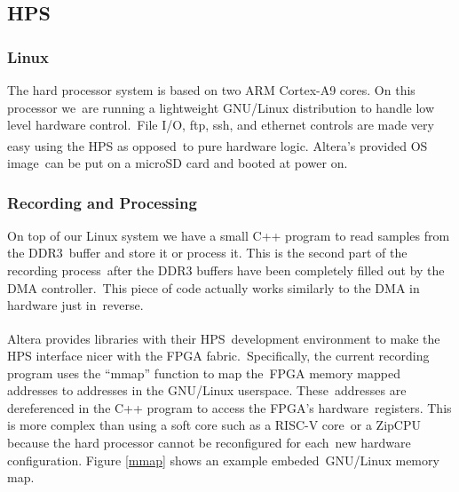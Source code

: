 \documentclass{article}
\begin{document}

\subsection{HPS}

\subsubsection{Linux}
The hard processor system is based on two ARM Cortex-A9 cores.  On this processor we\ are running a lightweight GNU/Linux distribution to handle low level hardware control.\
File I/O, ftp, ssh, and ethernet controls are made very easy using the HPS as opposed\
to pure hardware logic. Altera\textsuperscript{\textregistered{}}'s provided OS image\
can be put on a microSD card and booted at power on.

\subsubsection{Recording and Processing}
On top of our Linux system we have a small C++ program to read samples from the DDR3\
buffer and store it or process it.  This is the second part of the recording process\
after the DDR3 buffers have been completely filled out by the DMA controller.\
This piece of code actually works similarly to the DMA in hardware just in\
reverse. 

Altera\textsuperscript{\textregistered{}} provides libraries with their HPS\
development environment to make the HPS interface nicer with the FPGA fabric.\
Specifically, the current recording program uses the ``mmap'' function to map the\
FPGA memory mapped addresses to addresses in the GNU/Linux userspace. These\
addresses are dereferenced in the C++ program to access the FPGA's hardware\
registers. This is more complex than using a soft core such as a RISC-V core\
or a ZipCPU because the hard processor cannot be reconfigured for each\
new hardware configuration. Figure \ref{mmap} shows an example embeded\
GNU/Linux memory map.
\end{document}
